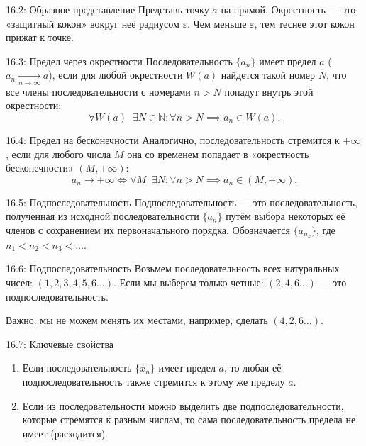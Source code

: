 \documentclass[a4paper,12pt]{article}
\begin{document}
	
	\begin{notebook}{16.2: Образное представление}
		Представь точку $a$ на прямой. Окрестность — это «защитный кокон» вокруг неё радиусом $\varepsilon$. Чем меньше $\varepsilon$, тем теснее этот кокон прижат к точке.
	\end{notebook}
	
	\begin{definitionbox}{16.3: Предел через окрестности}
		Последовательность $\{a_n\}$ имеет предел $a$ ($a_n \xrightarrow[n \to \infty]{} a$), если для любой окрестности $W(a)$ найдется такой номер $N$, что все члены последовательности с номерами $n > N$ попадут внутрь этой окрестности:
		\[ \forall W(a) \;\; \exists N \in \mathbb{N} \colon \forall n > N \implies a_n \in W(a) \text{.} \]
	\end{definitionbox}
	
	\begin{definitionbox}{16.4: Предел на бесконечности}
		Аналогично, последовательность стремится к $+\infty$, если для любого числа $M$ она со временем попадает в «окрестность бесконечности» $(M, +\infty)$:
		\[ a_n \to +\infty \iff \forall M \;\; \exists N \colon \forall n > N \implies a_n \in (M, +\infty) \text{.} \]
	\end{definitionbox}
	
	\begin{definitionbox}{16.5: Подпоследовательность}
		Подпоследовательность — это последовательность, полученная из исходной последовательности $\{a_n\}$ путём выбора некоторых её членов с сохранением их первоначального порядка. Обозначается $\{a_{n_k}\}$, где $n_1 < n_2 < n_3 < \dots$.
	\end{definitionbox}
	
	\begin{examplebox}{16.6: Подпоследовательность}
		Возьмем последовательность всех натуральных чисел: $(1, 2, 3, 4, 5, 6 \dots)$.
		Если мы выберем только четные: $(2, 4, 6 \dots)$ — это подпоследовательность.
		
		Важно: мы не можем менять их местами, например, сделать $(4, 2, 6 \dots)$.
	\end{examplebox}
	
	\begin{theorembox}{16.7: Ключевые свойства}
		\begin{enumerate}
			\item Если последовательность $\{x_n\}$ имеет предел $a$, то любая её подпоследовательность также стремится к этому же пределу $a$.
			\item Если из последовательности можно выделить две подпоследовательности, которые стремятся к разным числам, то сама последовательность предела не имеет (расходится).
		\end{enumerate}
	\end{theorembox}
	
\end{document}
